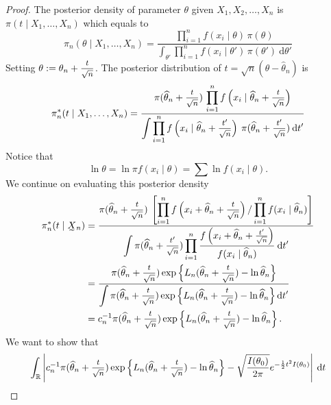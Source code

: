 \begin{proof}
    The posterior density of parameter $\theta$ given $X_1, X_2, \ldots, X_n$ is $\pi(t \mid X_1, \ldots, X_n) $ which equals to
    \begin{equation}
        \pi_n(\theta \mid X_1, \ldots, X_n) = \frac{\displaystyle \prod^n_{i=1} f(x_i \mid \theta)\, \pi(\theta) }{\displaystyle \int_{\theta'} \prod^n_{i=1} f(x_i \mid \theta')\, \pi(\theta') \> \mathrm{d}\theta'}
    \end{equation}
    Setting $\theta := \theta_n + \mfrac{t}{\sqrt{n}}$. The posterior distribution of $t = \sqrt{n}(\theta - \widehat{\theta}_n)$ is 
    \begin{equation}
        \pi^*_n(t \mid X_1, \ldots, X_n) = \frac{\displaystyle \pi ( \widehat{\theta}_n + \mfrac{t}{\sqrt{n}} ) \, \prod^n_{i=1} f \left(x_i \mid \widehat{\theta}_n + \mfrac{t}{\sqrt{n}} \right)}{\displaystyle \int \prod^n_{i=1} f \left(x_i \mid \widehat{\theta}_n + \mfrac{t'}{\sqrt{n}} \right) \> \pi (\widehat{\theta}_n + \mfrac{t'}{\sqrt{n}}) \> \mathrm{d}t'}
    \end{equation}
    Notice that 
    \[
        \ln \theta = \ln \pi f(x_i \mid \theta ) = \sum \ln f(x_i \mid \theta).
    \]
    We continue on evaluating this posterior density
    \begin{align*}
        \pi^*_n(t \mid \undertilde{X}_n) &= \frac{\displaystyle \pi ( \widehat{\theta}_n + \mfrac{t}{\sqrt{n}} ) \> \left[ \prod^n_{i=1} f \left(x_i + \widehat{\theta}_n + \mfrac{t}{\sqrt{n}} \right) / \prod^n_{i=1} f(x_i \mid \widehat{\theta}_n) \right]}{\displaystyle \int \pi (\widehat{\theta}_n + \mfrac{t'}{\sqrt{n}} ) \prod^n_{i=1} \frac{f\left( x_i + \widehat{\theta}_n + \frac{t'}{\sqrt{n}} \right)}{f(x_i \mid \widehat{\theta}_n )} \> \mathrm{d}t'}\\
        &= \frac{\displaystyle \pi ( \widehat{\theta}_n + \mfrac{t}{\sqrt{n}} ) \exp \left\{ L_n( \widehat{\theta}_n + \mfrac{t}{\sqrt{n}} ) - \ln \widehat{\theta}_n \right\}}{\displaystyle \int \pi ( \widehat{\theta}_n + \mfrac{t}{\sqrt{n}} ) \exp \left\{ L_n( \widehat{\theta}_n + \mfrac{t}{\sqrt{n}} ) - \ln \widehat{\theta}_n \right\} \mathrm{d}t'}\\
        &= c^{-1}_n \pi ( \widehat{\theta}_n + \mfrac{t}{\sqrt{n}} )  \exp \left\{ L_n( \widehat{\theta}_n + \mfrac{t}{\sqrt{n}} ) - \ln \widehat{\theta}_n \right\}.
    \end{align*}
    We want to show that 
    \[
        \int_\mathbb{R} \left| c^{-1}_n \pi ( \widehat{\theta}_n + \mfrac{t}{\sqrt{n}} )  \exp \left\{ L_n( \widehat{\theta}_n + \mfrac{t}{\sqrt{n}} ) - \ln \widehat{\theta}_n \right\} 
        - \sqrt{\frac{I(\theta_0)}{2\pi}} e^{-\frac{1}{2}t^2 I(\theta_0)}\right| \> \mathrm{d}t 
    \]
\end{proof}